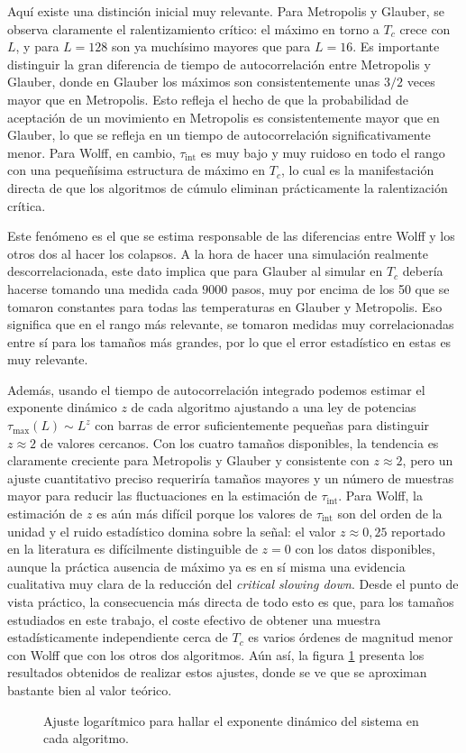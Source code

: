 Aquí existe una distinción inicial muy relevante. Para Metropolis y Glauber, se observa claramente el ralentizamiento crítico: el máximo en torno a $T_c$ crece con $L$, y para $L=128$ son ya muchísimo mayores que para $L=16$. Es importante distinguir la gran diferencia de tiempo de autocorrelación entre Metropolis y Glauber, donde en Glauber los máximos son consistentemente unas $3/2$ veces mayor que en Metropolis. Esto refleja el hecho de que la probabilidad de aceptación de un movimiento en Metropolis es consistentemente mayor que en Glauber, lo que se refleja en un tiempo de autocorrelación significativamente menor. Para Wolff, en cambio, $\tau_{\text{int}}$ es muy bajo y muy ruidoso en todo el rango con una pequeñísima estructura de máximo en $T_c$, lo cual es la manifestación directa de que los algoritmos de cúmulo eliminan prácticamente la ralentización crítica.

Este fenómeno es el que se estima responsable de las diferencias entre Wolff y los otros dos al hacer los colapsos. A la hora de hacer una simulación realmente descorrelacionada, este dato implica que para Glauber al simular en $T_c$ debería hacerse tomando una medida cada $9000$ pasos, muy por encima de los 50 que se tomaron constantes para todas las temperaturas en Glauber y Metropolis. Eso significa que en el rango más relevante, se tomaron medidas muy correlacionadas entre sí para los tamaños más grandes, por lo que el error estadístico en estas es muy relevante.

Además, usando el tiempo de autocorrelación integrado podemos estimar el exponente dinámico $z$ de cada algoritmo ajustando a una ley de potencias $\tau_{\max}(L) \sim L^z$ con barras de error suficientemente pequeñas para distinguir $z \approx 2$ de valores cercanos. Con los cuatro tamaños disponibles, la tendencia es claramente creciente para Metropolis y Glauber y consistente con $z \approx 2$, pero un ajuste cuantitativo preciso requeriría tamaños mayores y un número de muestras mayor para reducir las fluctuaciones en la estimación de $\tau_{\text{int}}$. Para Wolff, la estimación de $z$ es aún más difícil porque los valores de $\tau_{\text{int}}$ son del orden de la unidad y el ruido estadístico domina sobre la señal: el valor $z \approx 0{,}25$ reportado en la literatura \citep{Wolff1989} es difícilmente distinguible de $z = 0$ con los datos disponibles, aunque la práctica ausencia de máximo ya es en sí misma una evidencia cualitativa muy clara de la reducción del \textit{critical slowing down}. Desde el punto de vista práctico, la consecuencia más directa de todo esto es que, para los tamaños estudiados en este trabajo, el coste efectivo de obtener una muestra estadísticamente independiente cerca de $T_c$ es varios órdenes de magnitud menor con Wolff que con los otros dos algoritmos. Aún así, la figura \ref{fig:tint-scaling} presenta los resultados obtenidos de realizar estos ajustes, donde se ve que se aproximan bastante bien al valor teórico.

\begin{figure}
  \centering
  
  \caption{Ajuste logarítmico para hallar el exponente dinámico del sistema en cada algoritmo.}
  \label{fig:tint-scaling}
\end{figure}